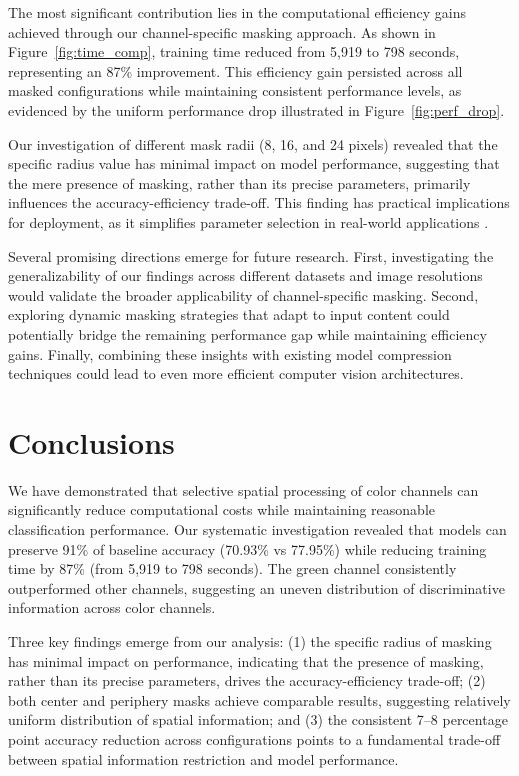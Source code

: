 \documentclass{article} %
\begin{document}
The most significant contribution lies in the computational efficiency gains achieved through our channel-specific masking approach. As shown in Figure~\ref{fig:time_comp}, training time reduced from 5,919 to 798 seconds, representing an 87\% improvement. This efficiency gain persisted across all masked configurations while maintaining consistent performance levels, as evidenced by the uniform performance drop illustrated in Figure~\ref{fig:perf_drop}.

Our investigation of different mask radii (8, 16, and 24 pixels) revealed that the specific radius value has minimal impact on model performance, suggesting that the mere presence of masking, rather than its precise parameters, primarily influences the accuracy-efficiency trade-off. This finding has practical implications for deployment, as it simplifies parameter selection in real-world applications \citep{wang2018mask}.

Several promising directions emerge for future research. First, investigating the generalizability of our findings across different datasets and image resolutions would validate the broader applicability of channel-specific masking. Second, exploring dynamic masking strategies that adapt to input content could potentially bridge the remaining performance gap while maintaining efficiency gains. Finally, combining these insights with existing model compression techniques could lead to even more efficient computer vision architectures.

\section{Conclusions}
\label{sec:conclusions}

We have demonstrated that selective spatial processing of color channels can significantly reduce computational costs while maintaining reasonable classification performance. Our systematic investigation revealed that models can preserve 91\% of baseline accuracy (70.93\% vs 77.95\%) while reducing training time by 87\% (from 5,919 to 798 seconds). The green channel consistently outperformed other channels, suggesting an uneven distribution of discriminative information across color channels.

Three key findings emerge from our analysis: (1) the specific radius of masking has minimal impact on performance, indicating that the presence of masking, rather than its precise parameters, drives the accuracy-efficiency trade-off; (2) both center and periphery masks achieve comparable results, suggesting relatively uniform distribution of spatial information; and (3) the consistent 7--8 percentage point accuracy reduction across configurations points to a fundamental trade-off between spatial information restriction and model performance.
\end{document}
